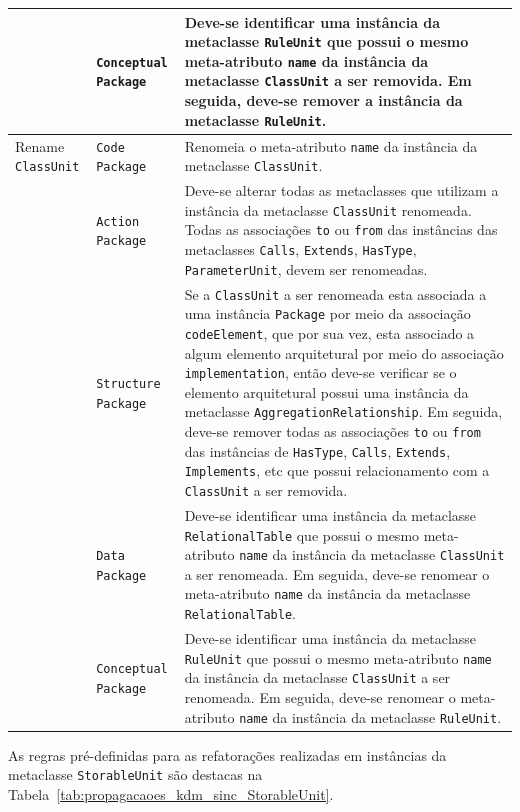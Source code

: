 \begin{longtable}{ | m{1.9cm} | m{3.57cm}| m{9.3cm} | }
\cline{2-3}
& \texttt{Conceptual Package} & Deve-se identificar uma instância da metaclasse \texttt{RuleUnit} que possui o mesmo meta-atributo \texttt{name} da instância da metaclasse \texttt{ClassUnit} a ser removida. Em seguida, deve-se remover a instância da metaclasse \texttt{RuleUnit}. \tabularnewline
\hline
Rename \texttt{ClassUnit} & \texttt{Code Package} & Renomeia o meta-atributo \texttt{name} da instância da metaclasse \texttt{ClassUnit}.\tabularnewline
\cline{2-3}
& \texttt{Action Package} & Deve-se alterar todas as metaclasses que utilizam a instância da metaclasse \texttt{ClassUnit} renomeada. Todas as associações \texttt{to} ou \texttt{from} das instâncias das metaclasses \texttt{Calls}, \texttt{Extends}, \texttt{HasType}, \texttt{ParameterUnit}, devem ser renomeadas. \tabularnewline
\cline{2-3}
& \texttt{Structure Package} & Se a \texttt{ClassUnit} a ser renomeada esta associada a uma instância \texttt{Package} por meio da associação \texttt{codeElement}, que por sua vez, esta associado a algum elemento arquitetural por meio do associação \texttt{implementation}, então deve-se verificar se o elemento arquitetural possui uma instância da metaclasse \texttt{AggregationRelationship}. Em seguida, deve-se remover todas as associações \texttt{to} ou \texttt{from} das instâncias de \texttt{HasType}, \texttt{Calls}, \texttt{Extends}, \texttt{Implements}, etc que possui relacionamento com a \texttt{ClassUnit} a ser removida. \tabularnewline
\cline{2-3}
& \texttt{Data Package} & Deve-se identificar uma instância da metaclasse \texttt{RelationalTable} que possui o mesmo meta-atributo \texttt{name} da instância da metaclasse \texttt{ClassUnit} a ser renomeada. Em seguida, deve-se renomear o meta-atributo \texttt{name} da instância da metaclasse \texttt{RelationalTable}. \tabularnewline
\cline{2-3}
& \texttt{Conceptual Package} & Deve-se identificar uma instância da metaclasse \texttt{RuleUnit} que possui o mesmo meta-atributo \texttt{name} da instância da metaclasse \texttt{ClassUnit} a ser renomeada. Em seguida, deve-se renomear o meta-atributo \texttt{name} da  instância da metaclasse \texttt{RuleUnit}. \tabularnewline
 \end{longtable}

As regras pré-definidas para as refatorações realizadas em instâncias da metaclasse \texttt{StorableUnit} são destacas na Tabela~\ref{tab:propagacaoes_kdm_sinc_StorableUnit}.


